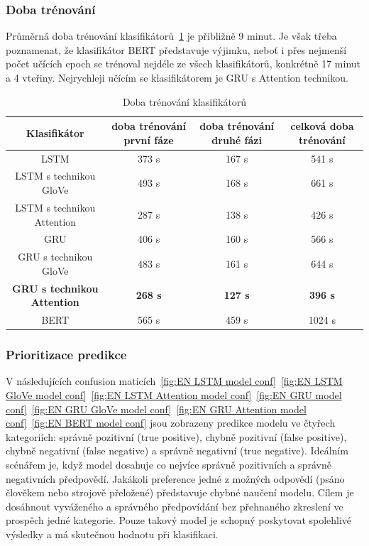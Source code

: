 \subsubsection{Doba trénování}
Průměrná doba trénování klasifikátorů~\ref{tab:EN doba trenovani} je přibližně 9 minut.
Je však třeba poznamenat, že klasifikátor BERT představuje výjimku, neboť i přes nejmenší počet učících epoch se trénoval nejdéle ze všech klasifikátorů, konkrétně 17 minut a 4 vteřiny.
Nejrychleji učícím se klasifikátorem je GRU s Attention technikou.

\begin{table}[H]
	\centering
	\caption{Doba trénování klasifikátorů}\label{tab:EN doba trenovani}
	\begin{tabular}{ c c c c }
			\toprule
			Klasifikátor & doba trénování první fáze & doba trénování druhé fázi & celková doba trénování\\
			\midrule
            LSTM & 373 s & 167 s & 541 s\\
            LSTM s technikou GloVe & 493 s & 168 s & 661 s\\
            LSTM s technikou Attention & 287 s & 138 s & 426 s\\
            GRU & 406 s & 160 s & 566 s\\
            GRU s technikou GloVe & 483 s & 161 s & 644 s\\
            \textbf{GRU s technikou Attention} & \textbf{268 s} & \textbf{127 s} & \textbf{396 s}\\
            BERT & 565 s & 459 s & 1024 s\\
			\midrule
		\end{tabular}
\end{table}

\subsubsection{Prioritizace predikce}
V následujících confusion maticích~\ref{fig:EN LSTM model conf}~\ref{fig:EN LSTM GloVe model conf}~\ref{fig:EN LSTM Attention model conf}~\ref{fig:EN GRU model conf}~\ref{fig:EN GRU GloVe model conf}~\ref{fig:EN GRU Attention model conf}~\ref{fig:EN BERT model conf} jsou zobrazeny predikce modelu ve čtyřech kategoriích: správně pozitivní (true positive), chybně pozitivní (false positive), chybně negativní (false negative) a správně negativní (true negative).
Ideálním scénářem je, když model dosahuje co nejvíce správně pozitivních a správně negativních předpovědí.
Jakákoli preference jedné z možných odpovědí (psáno člověkem nebo strojově přeložené) představuje chybné naučení modelu.
Cílem je dosáhnout vyváženého a správného předpovídání bez přehnaného zkreslení ve prospěch jedné kategorie.
Pouze takový model je schopný poskytovat spolehlivé výsledky a má skutečnou hodnotu při klasifikaci.

